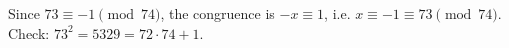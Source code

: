 Since $73\equiv-1\pmod{74}$, the congruence is $-x\equiv1$, i.e. $x\equiv-1\equiv\boxed{73}\pmod{74}$. Check: $73^2=5329=72\cdot74+1$.
